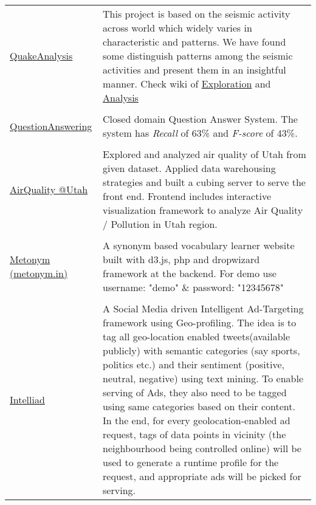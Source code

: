\documentclass[8pt]{article}
\renewcommand{\section}[2]%
        {\pagebreak[2]\vspace{1.3\baselineskip}%
         \phantomsection\addcontentsline{toc}{section}{#1}%
         \hspace{0in}%
         \marginpar{
         \raggedright \scshape #1}#2}
\begin{document}
\section{Projects}
\begin{tabular}[t]{@{}p{\textwidth-\rcollength-130pt}p{\rcollength+130pt}}
         \href{https://bitbucket.org/debjyotipaul385/quakeanalysis/wiki/Home}{QuakeAnalysis} & \hspace{0.5cm}  This project is based on the seismic activity across world which widely varies in characteristic and patterns. We have found some distinguish patterns among the seismic activities and present them in an insightful manner. Check wiki of \href{https://bitbucket.org/debjyotipaul385/quakeanalysis/wiki/Exploration}{Exploration} and \href{https://bitbucket.org/debjyotipaul385/quakeanalysis/wiki/Analysis}{Analysis}\\
       \\ 
        \href{https://github.com/debjyoti385/QuestionAnswerNLP}{QuestionAnswering} & \hspace{0.5cm}  Closed domain Question Answer System. The system has \emph{Recall} of  63\% and \emph{F-score} of 43\%.   \\
       \\ 
        \href{http://debjyoti385.github.io/AirQuality/}{AirQuality @Utah } & \hspace{0.5cm} Explored and analyzed air quality of Utah from given dataset. Applied data warehousing strategies and built a cubing server to serve the front end. Frontend includes interactive visualization framework to analyze Air Quality / Pollution in Utah region.  \\
       \\ 
    \href{http://metonym.in}{Metonym (metonym.in)} & \hspace{0.5cm} A synonym based vocabulary learner website built with d3.js, php and dropwizard framework at the backend. For demo use username: "demo" \& password: "12345678"  \\
       \\ 
    \href{http://github.com/debjyoti385/intelliad}{Intelliad} & \hspace{0.5cm}  A Social Media driven Intelligent Ad-Targeting framework using Geo-profiling. The idea is to tag all geo-location enabled tweets(available publicly) with semantic categories (say sports, politics etc.) and their sentiment (positive, neutral, negative) using text mining. To enable serving of Ads, they also need to be tagged using same categories based on their content. In the end, for every geolocation-enabled ad request, tags of data points in vicinity (the neighbourhood being controlled online) will be used to generate a runtime profile for the request, and appropriate ads will be picked for serving.  \\

\end{tabular}
\end{document}

